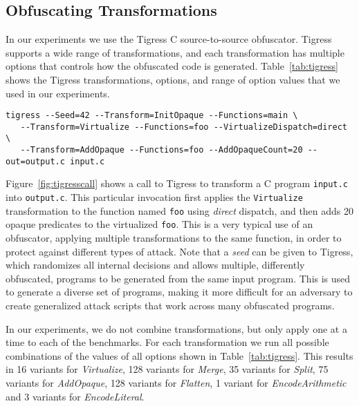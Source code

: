 \subsection{Obfuscating Transformations}



In our experiments we use the Tigress C source-to-source obfuscator. Tigress supports a wide range of transformations, and each transformation has multiple options that controls how the obfuscated code is generated. Table~\ref{tab:tigress} shows the Tigress transformations, options, and range of option values that we used in our experiments.

\begin{figure*}
\begin{center}
\begin{minipage}{12cm}
\begin{lstlisting}[basicstyle=\footnotesize]
tigress --Seed=42 --Transform=InitOpaque --Functions=main \
   --Transform=Virtualize --Functions=foo --VirtualizeDispatch=direct \
   --Transform=AddOpaque --Functions=foo --AddOpaqueCount=20 --out=output.c input.c
\end{lstlisting}
\end{minipage}
\end{center}
\caption{Example Tigress invocation.}
\label{fig:tigresscall}
\end{figure*}

Figure~\ref{fig:tigresscall} shows a  call to Tigress to transform a C program {\tt input.c} into {\tt output.c}. This particular invocation first applies the {\tt Virtualize} transformation to the function named {\tt foo} using {\em direct} dispatch, and then adds 20 opaque predicates to the virtualized {\tt foo}. This is a very typical use of an obfuscator, applying multiple transformations to the same function, in order to protect against different types of attack. Note that a {\em seed} can be given to Tigress, which randomizes all internal decisions and allows multiple, differently obfuscated, programs to be generated from the same input program. This is used to generate a diverse set of programs, making it more difficult for an adversary to create generalized attack scripts that work across many obfuscated programs. 

In our experiments, we do not combine transformations, but only apply one at a time to each of the benchmarks. For each transformation we run all possible combinations of the values of all options shown in Table~\ref{tab:tigress}. This results in 16 variants for \emph{Virtualize}, 128 variants for \emph{Merge}, 35 variants for \emph{Split}, 75 variants for \emph{AddOpaque}, 128 variants for \emph{Flatten}, 1 variant for \emph{EncodeArithmetic} and 3 variants for \emph{EncodeLiteral}. 


